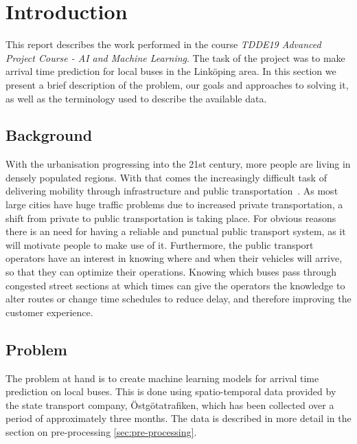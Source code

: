 


\chapter{Introduction}
\label{cha:introduction}
This report describes the work performed in the course \textit{TDDE19 Advanced Project Course - AI and Machine Learning}. The task of the project was to make arrival time prediction for local buses in the Link\"oping area. In this section we present a brief description of the problem, our goals and approaches to solving it, as well as the terminology used to describe the available data.

\section{Background}
With the urbanisation progressing into the 21st century, more people are living in densely populated regions. With that comes the increasingly difficult task of delivering mobility through infrastructure and public transportation~\cite{kotter2004risks}. As most large cities have huge traffic problems due to increased private transportation, a shift from private to public transportation is taking place. For obvious reasons there is an need for having a reliable and punctual public transport system, as it will motivate people to make use of it. Furthermore, the public transport operators have an interest in knowing where and when their vehicles will arrive, so that they can optimize their operations. Knowing which buses pass through congested street sections at which times can give the operators the knowledge to alter routes or change time schedules to reduce delay, and therefore improving the customer experience.

\section{Problem}
\label{sec:problem}
The problem at hand is to create machine learning models for arrival time prediction on local buses. This is done using spatio-temporal data provided by the state transport company, \"Ostg\"otatrafiken, which has been collected over a period of approximately three months. The data is described in more detail in the section on pre-processing \ref{sec:pre-processing}.

